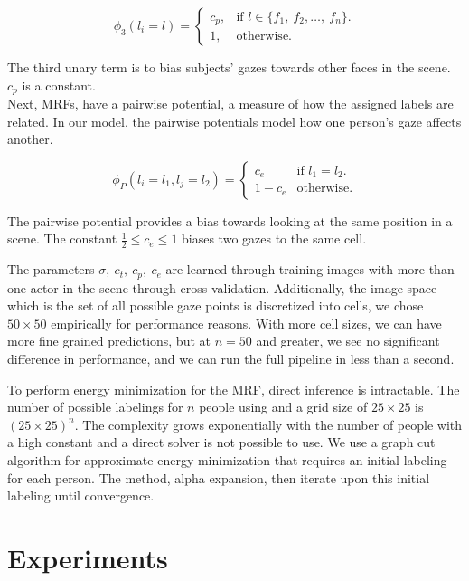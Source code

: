 \documentclass[10pt,twocolumn,letterpaper]{article}
\begin{document}
\begin{equation}
  \phi_3(l_i = l) = \begin{cases}
    c_p, & \text{if $l \in \{f_1,\ f_2,\dots,\ f_n\}$}.\\
    1, & \text{otherwise}.
  \end{cases}
\end{equation}

The third unary term is to bias subjects' gazes towards other faces in the scene. $c_p$ is a constant. \\

Next, MRFs, have a pairwise potential, a measure of how the assigned labels are related. In our model, the pairwise potentials model how one person's gaze affects another.

\begin{equation}
  \phi_P(l_i = l_1, l_j = l_2) = \begin{cases}
    c_e & \text{if $l_1 = l_2$}.\\
    1 - c_e & \text{otherwise}.
  \end{cases}
\end{equation}

The pairwise potential provides a bias towards looking at the same position in a scene. The constant $\frac{1}{2} \leq c_e \leq 1$ biases two gazes to the same cell.

The parameters $\sigma,\ c_t,\ c_p,\ c_e$ are learned through training images with more than one actor in the scene through cross validation.
Additionally, the image space which is the set of all possible gaze points is discretized into cells, we chose $50 \times 50$ empirically for performance reasons. With more cell sizes, we can have more fine grained predictions, but at $n = 50$ and greater, we see no significant difference in performance, and we can run the full pipeline in less than a second.

To perform energy minimization for the MRF, direct inference is intractable. The number of possible labelings for $n$ people using and a grid size of $25 \times 25$ is $ (25 \times 25)^n$. The complexity grows exponentially with the number of people with a high constant and a direct solver is not possible to use. We use a graph cut algorithm \cite{boykov2001fast} for approximate energy minimization that requires an initial labeling for each person. The method, alpha expansion, then iterate upon this initial labeling until convergence.

\section{Experiments}
\end{document}
